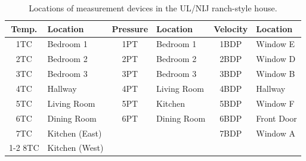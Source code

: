 \begin{table}[ht!]
\begin{center}
\begin{tabular}{|c|l||c|l||c|l|}
\hline
Temp.           	& Location 			& Pressure          	& Location 		& Velocity              & Location 	\\ \hline \hline
1TC  				& Bedroom 1 		& 1PT 					& Bedroom 1 	& 1BDP 					& Window E 	\\ \hline
2TC  				& Bedroom 2 		& 2PT 					& Bedroom 2 	& 2BDP 					& Window D 	\\ \hline
3TC  				& Bedroom 3 		& 3PT 					& Bedroom 3 	& 3BDP 					& Window B 	\\ \hline
4TC  				& Hallway 			& 4PT 					& Living Room 	& 4BDP 					& Hallway 	\\ \hline
5TC  				& Living Room 		& 5PT 					& Kitchen 		& 5BDP 					& Window F 	\\ \hline
6TC  				& Dining Room 		& 6PT 					& Dining Room 	& 6BDP 					& Front Door\\ \hline
7TC  				& Kitchen (East) 	& \multicolumn{2}{r||}{}				& 7BDP 					& Window A 	\\ \cline{1-2} \cline{5-6}
8TC  				& Kitchen (West) 	& \multicolumn{2}{r}{}					& \multicolumn{2}{r|}{}  			\\ \hline
\end{tabular}
\end{center}
\caption[Locations of measurement devices in the UL/NIJ ranch-style house]
{Locations of measurement devices in the UL/NIJ ranch-style house.}
\label{Ranch_devices}
\end{table}

